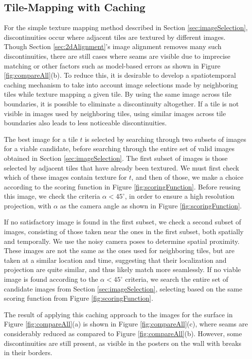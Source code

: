 \documentclass[]{spie}  %
\begin{document}
\subsection{Tile-Mapping with Caching}
\label{sec:mappingWithCaching}
For the simple texture mapping method described in Section
\ref{sec:imageSelection}, discontinuities occur where adjacent tiles
are textured by different images. Though Section
\ref{sec:2dAlignment}'s image alignment removes many such
discontinuities, there are still cases where seams are visible due to
imprecise matching or other factors such as model-based errors as
shown in Figure \ref{fig:compareAll}(b). To reduce this, it is
desirable to develop a spatiotemporal caching mechanism to take into
account image selections made by neighboring tiles while texture
mapping a given tile. By using the same image across tile boundaries,
it is possible to eliminate a discontinuity altogether. If a tile is
not visible in images used by neighboring tiles, using similar images
across tile boundaries also leads to less noticeable discontinuities.

The best image for a tile $t$ is selected by searching through two
subsets of images for a viable candidate, before searching through the
entire set of valid images obtained in Section
\ref{sec:imageSelection}. The first subset of images is those selected
by adjacent tiles that have already been textured. We must first check
which of these images contain texture for $t$, and then of those, we
make a choice according to the scoring function in Figure
\ref{fig:scoringFunction}. Before reusing this image, we check the
criteria $\alpha < 45^\circ$, in order to ensure a high resolution
projection, with $\alpha$ as the camera angle as shown in Figure
\ref{fig:scoringFunction}.

If no satisfactory image is found in the first subset, we check a
second subset of images, consisting of those taken near the ones in
the first subset, both spatially and temporally. We use the noisy
camera poses to determine spatial proximity. These images are not the
same as the ones used for neighboring tiles, but are taken at a
similar location and time, suggesting that their localization and
projection are quite similar, and thus likely match more
seamlessly. If no viable image is found according to the $\alpha <
45^\circ$ criteria, we search the entire set of candidate images from
Section \ref{sec:imageSelection}, selecting based on the same scoring
function from Figure \ref{fig:scoringFunction}.

The result of applying this caching approach to the images for the
surface in Figure \ref{fig:compareAll}(a) is shown in Figure
\ref{fig:compareAll}(c), where seams are considerably reduced as
compared to Figure \ref{fig:compareAll}(b). However, some
discontinuities are still present, as visible in the posters on the
wall with breaks in their borders.
\end{document}
